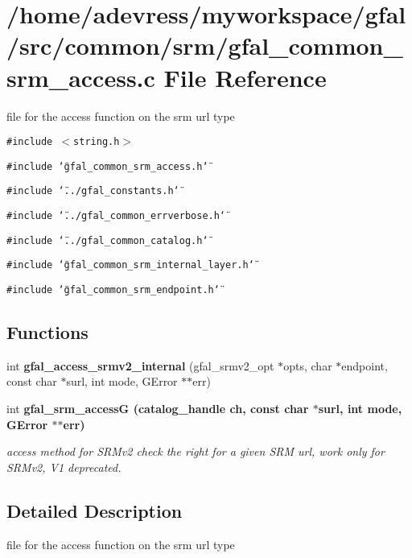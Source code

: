 \section{/home/adevress/myworkspace/gfal/src/common/srm/gfal\_\-common\_\-srm\_\-access.c File Reference}
\label{gfal__common__srm__access_8c}
file for the access function on the srm url type 

{\tt \#include $<$string.h$>$}\par
{\tt \#include \char`\"{}gfal\_\-common\_\-srm\_\-access.h\char`\"{}}\par
{\tt \#include \char`\"{}../gfal\_\-constants.h\char`\"{}}\par
{\tt \#include \char`\"{}../gfal\_\-common\_\-errverbose.h\char`\"{}}\par
{\tt \#include \char`\"{}../gfal\_\-common\_\-catalog.h\char`\"{}}\par
{\tt \#include \char`\"{}gfal\_\-common\_\-srm\_\-internal\_\-layer.h\char`\"{}}\par
{\tt \#include \char`\"{}gfal\_\-common\_\-srm\_\-endpoint.h\char`\"{}}\par
\subsection*{Functions}
\begin{CompactItemize}
\item 
int \textbf{gfal\_\-access\_\-srmv2\_\-internal} (gfal\_\-srmv2\_\-opt $\ast$opts, char $\ast$endpoint, const char $\ast$surl, int mode, GError $\ast$$\ast$err)\label{gfal__common__srm__access_8c_482394e183f4026d547f17575dc4b8dd}

\item 
int \bf{gfal\_\-srm\_\-access\-G} (catalog\_\-handle ch, const char $\ast$surl, int mode, GError $\ast$$\ast$err)
\begin{CompactList}\small\item\em access method for SRMv2 check the right for a given SRM url, work only for SRMv2, V1 deprecated. \item\end{CompactList}\end{CompactItemize}


\subsection{Detailed Description}
file for the access function on the srm url type 

